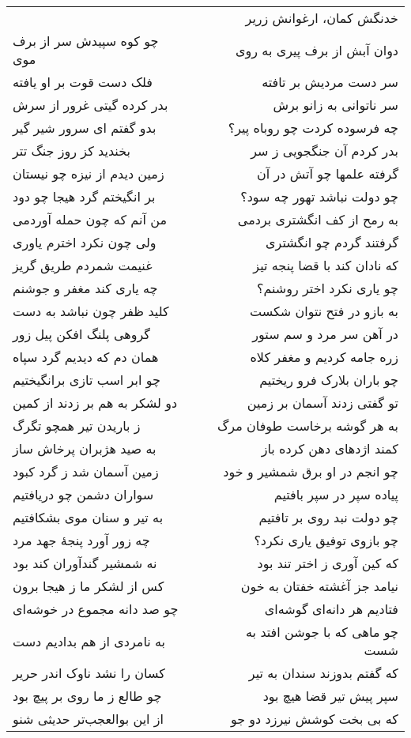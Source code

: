\begin{center}
\begin{longtable}{l p{0.5cm} r}
&&
خدنگش کمان، ارغوانش زریر
\\
چو کوه سپیدش سر از برف موی
&&
دوان آبش از برف پیری به روی
\\
فلک دست قوت بر او یافته
&&
سر دست مردیش بر تافته
\\
بدر کرده گیتی غرور از سرش
&&
سر ناتوانی به زانو برش
\\
بدو گفتم ای سرور شیر گیر
&&
چه فرسوده کردت چو روباه پیر؟
\\
بخندید کز روز جنگ تتر
&&
بدر کردم آن جنگجویی ز سر
\\
زمین دیدم از نیزه چو نیستان
&&
گرفته علمها چو آتش در آن
\\
بر انگیختم گرد هیجا چو دود
&&
چو دولت نباشد تهور چه سود؟
\\
من آنم که چون حمله آوردمی
&&
به رمح از کف انگشتری بردمی
\\
ولی چون نکرد اخترم یاوری
&&
گرفتند گردم چو انگشتری
\\
غنیمت شمردم طریق گریز
&&
که نادان کند با قضا پنجه تیز
\\
چه یاری کند مغفر و جوشنم
&&
چو یاری نکرد اختر روشنم؟
\\
کلید ظفر چون نباشد به دست
&&
به بازو در فتح نتوان شکست
\\
گروهی پلنگ افکن پیل زور
&&
در آهن سر مرد و سم ستور
\\
همان دم که دیدیم گرد سپاه
&&
زره جامه کردیم و مغفر کلاه
\\
چو ابر اسب تازی برانگیختیم
&&
چو باران بلارک فرو ریختیم
\\
دو لشکر به هم بر زدند از کمین
&&
تو گفتی زدند آسمان بر زمین
\\
ز باریدن تیر همچو تگرگ
&&
به هر گوشه برخاست طوفان مرگ
\\
به صید هژبران پرخاش ساز
&&
کمند اژدهای دهن کرده باز
\\
زمین آسمان شد ز گرد کبود
&&
چو انجم در او برق شمشیر و خود
\\
سواران دشمن چو دریافتیم
&&
پیاده سپر در سپر بافتیم
\\
به تیر و سنان موی بشکافتیم
&&
چو دولت نبد روی بر تافتیم
\\
چه زور آورد پنجهٔ جهد مرد
&&
چو بازوی توفیق یاری نکرد؟
\\
نه شمشیر گندآوران کند بود
&&
که کین آوری ز اختر تند بود
\\
کس از لشکر ما ز هیجا برون
&&
نیامد جز آغشته خفتان به خون
\\
چو صد دانه مجموع در خوشه‌ای
&&
فتادیم هر دانه‌ای گوشه‌ای
\\
به نامردی از هم بدادیم دست
&&
چو ماهی که با جوشن افتد به شست
\\
کسان را نشد ناوک اندر حریر
&&
که گفتم بدوزند سندان به تیر
\\
چو طالع ز ما روی بر پیچ بود
&&
سپر پیش تیر قضا هیچ بود
\\
از این بوالعجب‌تر حدیثی شنو
&&
که بی بخت کوشش نیرزد دو جو
\\
\end{longtable}
\end{center}
